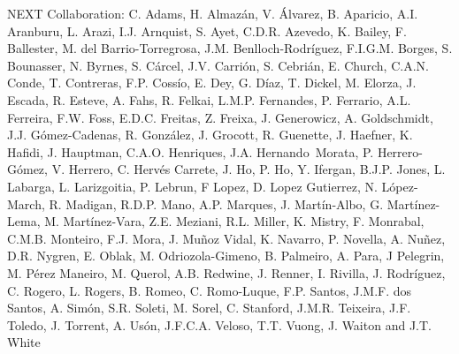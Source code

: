 NEXT Collaboration: C. Adams, H. Almaz\'an, V. \'Alvarez, B. Aparicio, A.I. Aranburu, L. Arazi, I.J. Arnquist, S. Ayet, C.D.R. Azevedo, K. Bailey, F. Ballester, M. del Barrio-Torregrosa, J.M. Benlloch-Rodr\'{i}guez, F.I.G.M. Borges, S. Bounasser, N. Byrnes, S. C\'arcel, J.V. Carri\'on, S. Cebri\'an, E. Church, C.A.N. Conde, T. Contreras, F.P. Coss\'io, E. Dey, G. D\'iaz, T. Dickel, M. Elorza, J. Escada, R. Esteve, A. Fahs, R. Felkai, L.M.P. Fernandes, P. Ferrario, A.L. Ferreira, F.W. Foss, E.D.C. Freitas, Z. Freixa, J. Generowicz, A. Goldschmidt, J.J. G\'omez-Cadenas, R. Gonz\'alez, J. Grocott, R. Guenette, J. Haefner, K. Hafidi, J. Hauptman, C.A.O. Henriques, J.A. Hernando~Morata, P. Herrero-G\'omez, V. Herrero, C. Herv\'es Carrete, J. Ho, P. Ho, Y. Ifergan, B.J.P. Jones, L. Labarga, L. Larizgoitia, P. Lebrun, F Lopez, D. Lopez Gutierrez, N. L\'opez-March, R. Madigan, R.D.P. Mano, A.P. Marques, J. Mart\'in-Albo, G. Mart\'inez-Lema, M. Mart\'inez-Vara, Z.E. Meziani, R.L. Miller, K. Mistry, F. Monrabal, C.M.B. Monteiro, F.J. Mora, J. Mu\~noz Vidal, K. Navarro, P. Novella, A. Nu\~{n}ez, D.R. Nygren, E. Oblak, M. Odriozola-Gimeno, B. Palmeiro, A. Para, J Pelegrin, M. P\'erez Maneiro, M. Querol, A.B. Redwine, J. Renner, I. Rivilla, J. Rodr\'iguez, C. Rogero, L. Rogers, B. Romeo, C. Romo-Luque, F.P. Santos, J.M.F. dos Santos, A. Sim\'on, S.R. Soleti, M. Sorel, C. Stanford, J.M.R. Teixeira, J.F. Toledo, J. Torrent, A. Us\'on, J.F.C.A. Veloso, T.T. Vuong, J. Waiton and J.T. White